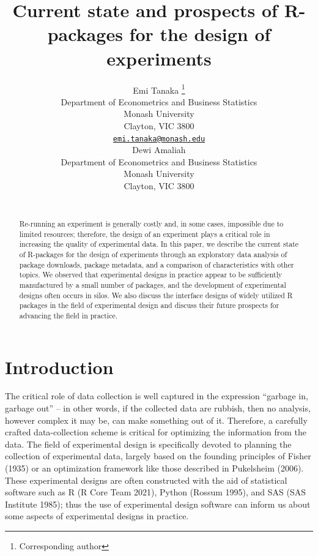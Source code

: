 \documentclass{article}
\title{Current state and prospects of R-packages for the design of
experiments}
\author{
    Emi Tanaka
    \thanks{Corresponding author}
   \\
    Department of Econometrics and Business Statistics \\
    Monash University \\
  Clayton, VIC 3800 \\
  \texttt{\href{mailto:emi.tanaka@monash.edu}{\nolinkurl{emi.tanaka@monash.edu}}} \\
   \And
    Dewi Amaliah
   \\
    Department of Econometrics and Business Statistics \\
    Monash University \\
  Clayton, VIC 3800 \\
  \texttt{} \\
  }
\begin{document}
\maketitle


\begin{abstract}
Re-running an experiment is generally costly and, in some cases,
impossible due to limited resources; therefore, the design of an
experiment plays a critical role in increasing the quality of
experimental data. In this paper, we describe the current state of
R-packages for the design of experiments through an exploratory data
analysis of package downloads, package metadata, and a comparison of
characteristics with other topics. We observed that experimental designs
in practice appear to be sufficiently manufactured by a small number of
packages, and the development of experimental designs often occurs in
silos. We also discuss the interface designs of widely utilized R
packages in the field of experimental design and discuss their future
prospects for advancing the field in practice.
\end{abstract}


\hypertarget{introduction}{%
\section{Introduction}\label{introduction}}

The critical role of data collection is well captured in the expression
``garbage in, garbage out'' -- in other words, if the collected data are
rubbish, then no analysis, however complex it may be, can make something
out of it. Therefore, a carefully crafted data-collection scheme is
critical for optimizing the information from the data. The field of
experimental design is specifically devoted to planning the collection
of experimental data, largely based on the founding principles of Fisher
(1935) or an optimization framework like those described in Pukelsheim
(2006). These experimental designs are often constructed with the aid of
statistical software such as R (R Core Team 2021), Python (Rossum 1995),
and SAS (SAS Institute 1985); thus the use of experimental design
software can inform us about some aspects of experimental designs in
practice.
\end{document}
